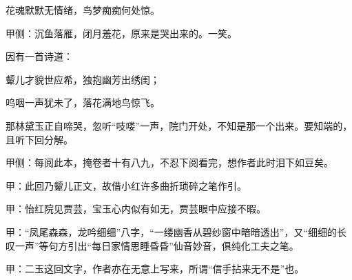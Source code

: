 \begin{poem}
    \begin{pl}花魂默默无情绪，鸟梦痴痴何处惊。\end{pl}\begin{note}甲侧：沉鱼落雁，闭月羞花，原来是哭出来的。一笑。\end{note}
\end{poem}


\begin{parag}
    因有一首诗道：
\end{parag}


\begin{poem}
    \begin{pl}颦儿才貌世应希，独抱幽芳出绣闺；\end{pl}

    \begin{pl}呜咽一声犹未了，落花满地鸟惊飞。\end{pl}
\end{poem}


\begin{parag}
    那林黛玉正自啼哭，忽听“吱喽”一声，院门开处，不知是那一个出来。要知端的，且听下回分解。\begin{note}甲侧：每阅此本，掩卷者十有八九，不忍下阅看完，想作者此时泪下如豆矣。\end{note}
\end{parag}


\begin{parag}
    \begin{note}甲：此回乃颦儿正文，故借小红许多曲折琐碎之笔作引。\end{note}
\end{parag}


\begin{parag}
    \begin{note}甲：怡红院见贾芸，宝玉心内似有如无，贾芸眼中应接不暇。\end{note}
\end{parag}


\begin{parag}
    \begin{note}甲：“凤尾森森，龙吟细细”八字，“一缕幽香从碧纱窗中暗暗透出”，又“细细的长叹一声”等句方引出“每日家情思睡昏昏”仙音妙音，俱纯化工夫之笔。\end{note}
\end{parag}


\begin{parag}
    \begin{note}甲：二玉这回文字，作者亦在无意上写来，所谓“信手拈来无不是”也。\end{note}
\end{parag}


